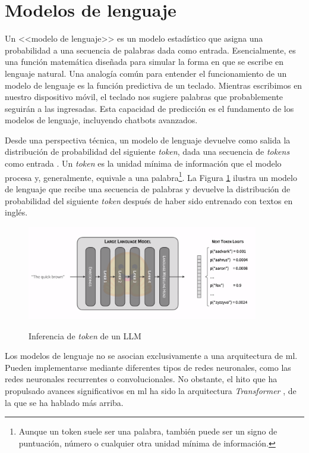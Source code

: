 \section{Modelos de lenguaje}

Un <<modelo de lenguaje>> es un modelo estadístico que asigna una probabilidad a una secuencia de palabras dada como entrada. Esencialmente, es una función matemática diseñada para simular la forma en que se escribe en lenguaje natural. Una analogía común para entender el funcionamiento de un modelo de lenguaje es la función predictiva de un teclado. Mientras escribimos en nuestro dispositivo móvil, el teclado nos sugiere palabras que probablemente seguirán a las ingresadas. Esta capacidad de predicción es el fundamento de los modelos de lenguaje, incluyendo chatbots avanzados.

Desde una perspectiva técnica, un modelo de lenguaje devuelve como salida la distribución de probabilidad del siguiente \textit{token}, dada una secuencia de \textit{tokens} como entrada \citep{GenerationLLMs}. Un \textit{token} es la unidad mínima de información que el modelo procesa y, generalmente, equivale a una palabra\footnote{Aunque un token suele ser una palabra, también puede ser un signo de puntuación, número o cualquier otra unidad mínima de información.}. La Figura \ref{fig:llm_generation} ilustra un modelo de lenguaje que recibe una secuencia de palabras y devuelve la distribución de probabilidad del siguiente \textit{token} después de haber sido entrenado con textos en inglés.

\begin{figure}[H]
    \caption[Inferencia de \textit{token} de un LLM]{Inferencia de \textit{token} de un LLM}
    \centering
    \includegraphics[width=0.9\textwidth]{./figuras/LLM_predice_token.png}
    \label{fig:llm_generation}
\end{figure}

Los modelos de lenguaje no se asocian exclusivamente a una arquitectura de \gls{ml}. Pueden implementarse mediante diferentes tipos de redes neuronales, como las redes neuronales recurrentes o convolucionales. No obstante, el hito que ha propulsado avances significativos en \gls{ml} ha sido la arquitectura \textit{Transformer} \citep{vaswaniAttentionAllYou2017}, de la que se ha hablado más arriba.

